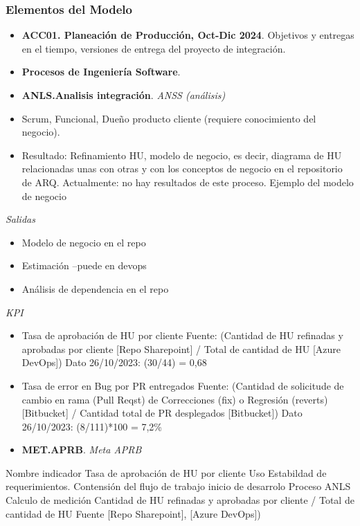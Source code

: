 \documentclass[
  paper=a4,
  ,captions=tableheading
]{scrartcl}
\providecommand{\tightlist}{%
  \setlength{\itemsep}{0pt}\setlength{\parskip}{0pt}}
\begin{document}
\subsubsection{Elementos del Modelo}\label{sec:elementos-del-modelo}

\begin{itemize}
\item
  \textbf{ACC01. Planeación de Producción, Oct-Dic 2024}. Objetivos y
  entregas en el tiempo, versiones de entrega del proyecto de
  integración.
\item
  \textbf{Procesos de Ingeniería Software}.
\item
  \textbf{ANLS.Analisis integración}. \emph{ANSS (análisis)}
\item
  Scrum, Funcional, Dueño producto cliente (requiere conocimiento del
  negocio).
\item
  Resultado: Refinamiento HU, modelo de negocio, es decir, diagrama de
  HU relacionadas unas con otras y con los conceptos de negocio en el
  repositorio de ARQ. Actualmente: no hay resultados de este proceso.
  Ejemplo del modelo de negocio
\end{itemize}

\emph{Salidas}

\begin{itemize}
\tightlist
\item
  Modelo de negocio en el repo
\item
  Estimación --puede en devops
\item
  Análisis de dependencia en el repo
\end{itemize}

\emph{KPI}

\begin{itemize}
\item
  Tasa de aprobación de HU por cliente Fuente: (Cantidad de HU refinadas
  y aprobadas por cliente {[}Repo Sharepoint{]} / Total de cantidad de
  HU {[}Azure DevOps{]}) Dato 26/10/2023: (30/44) = 0,68
\item
  Tasa de error en Bug por PR entregados Fuente: (Cantidad de solicitude
  de cambio en rama (Pull Reqst) de Correcciones (fix) o Regresión
  (reverts) {[}Bitbucket{]} / Cantidad total de PR desplegados
  {[}Bitbucket{]}) Dato 26/10/2023: (8/111)*100 = 7,2\%
\item
  \textbf{MET.APRB}. \emph{Meta APRB}
\end{itemize}

Nombre indicador Tasa de aprobación de HU por cliente Uso Estabildad de
requerimientos. Contensión del flujo de trabajo inicio de desarrolo
Proceso ANLS Calculo de medición Cantidad de HU refinadas y aprobadas
por cliente / Total de cantidad de HU Fuente {[}Repo Sharepoint{]},
{[}Azure DevOps{]})
\end{document}
